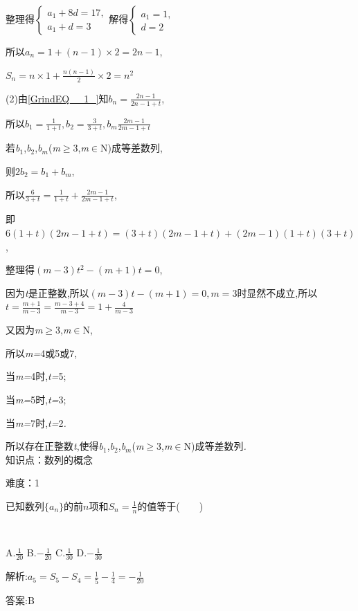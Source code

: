 \documentclass{article} %
\begin{document}
整理得$\left\{
\begin{array}{l}
a_1+8d=17, \\
a_1+d=3
\end{array}
\right.$解得$\left\{
\begin{array}{l}
a_1=1, \\
d=2
\end{array}
\right.$

所以$a_n=1+(n-1)\times 2=2n-1$,

$S_n=n\times 1+\frac{n(n-1)}{2}\times 2=n^2$

(2)由\eqref{GrindEQ__1_}知$b_n=\frac{2n-1}{2n-1+t}$,

所以$b_1=\frac{1}{1+t},b_2=\frac{3}{3+t},b_m\frac{2m-1}{2m-1+t}$

若\textit{b}${}_{1}$,\textit{b}${}_{2}$,\textit{b${}_{m}$}(\textit{m}$\mathrm{\ge}$3,\textit{m}$\mathrm{\in}$N)成等差数列,

则$2b_2=b_1+b_m$,

所以$\frac{6}{3+t}=\frac{1}{1+t}+\frac{2m-1}{2m-1+t}$,

即$6(1+t)(2m-1+t)=(3+t)(2m-1+t)+(2m-1)(1+t)(3+t)$,

整理得$(m-3)t^2-(m+1)t=0$,

因为\textit{t}是正整数,所以$(m-3)t-(m+1)=0,m=3$时显然不成立,所以$t=\frac{m+1}{m-3}=\frac{m-3+4}{m-3}=1+\frac{4}{m-3}$

又因为\textit{m}$\mathrm{\ge}$3,\textit{m}$\mathrm{\in}$N,

所以\textit{m=}4或5或7,

当\textit{m=}4时,\textit{t=}5;

当\textit{m=}5时,\textit{t=}3;

当\textit{m=}7时,\textit{t=}2\textit{.}

所以存在正整数\textit{t},使得\textit{b}${}_{1}$,\textit{b}${}_{2}$,\textit{b${}_{m}$}(\textit{m}$\mathrm{\ge}$3,\textit{m}$\mathrm{\in}$N)成等差数列\textit{.} \\

知识点：数列的概念

难度：1

 已知数列$\{a_n\}$的前$n$项和$S_n=\frac{1}{n}$的值等于(\textit{　　})

 \textit{　　　　　　　　　　　　　　　　}

 A.$\frac{1}{20}$ B.$-\frac{1}{20}$ C.$\frac{1}{30}$ D.$-\frac{1}{30}$

 解析:$a_5=S_5-S_4=\frac{1}{5}-\frac{1}{4}=-\frac{1}{20}$

 答案:B \\
\end{document}
